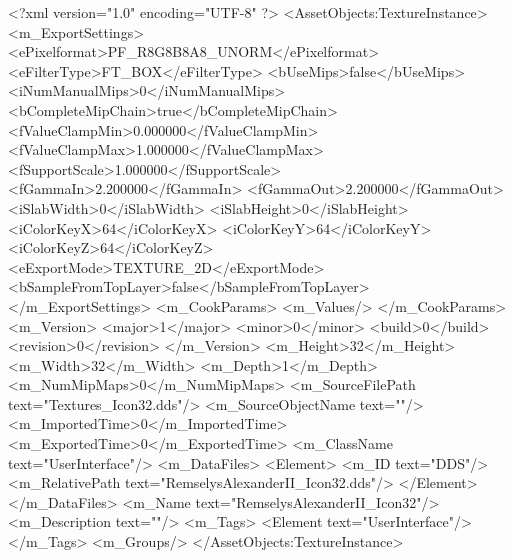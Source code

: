 <?xml version="1.0" encoding="UTF-8" ?>
<AssetObjects:TextureInstance>
	<m_ExportSettings>
		<ePixelformat>PF_R8G8B8A8_UNORM</ePixelformat>
		<eFilterType>FT_BOX</eFilterType>
		<bUseMips>false</bUseMips>
		<iNumManualMips>0</iNumManualMips>
		<bCompleteMipChain>true</bCompleteMipChain>
		<fValueClampMin>0.000000</fValueClampMin>
		<fValueClampMax>1.000000</fValueClampMax>
		<fSupportScale>1.000000</fSupportScale>
		<fGammaIn>2.200000</fGammaIn>
		<fGammaOut>2.200000</fGammaOut>
		<iSlabWidth>0</iSlabWidth>
		<iSlabHeight>0</iSlabHeight>
		<iColorKeyX>64</iColorKeyX>
		<iColorKeyY>64</iColorKeyY>
		<iColorKeyZ>64</iColorKeyZ>
		<eExportMode>TEXTURE_2D</eExportMode>
		<bSampleFromTopLayer>false</bSampleFromTopLayer>
	</m_ExportSettings>
	<m_CookParams>
		<m_Values/>
	</m_CookParams>
	<m_Version>
		<major>1</major>
		<minor>0</minor>
		<build>0</build>
		<revision>0</revision>
	</m_Version>
	<m_Height>32</m_Height>
	<m_Width>32</m_Width>
	<m_Depth>1</m_Depth>
	<m_NumMipMaps>0</m_NumMipMaps>
	<m_SourceFilePath text="Textures\RemselysAlexanderII_Icon32.dds"/>
	<m_SourceObjectName text=""/>
	<m_ImportedTime>0</m_ImportedTime>
	<m_ExportedTime>0</m_ExportedTime>
	<m_ClassName text="UserInterface"/>
	<m_DataFiles>
		<Element>
			<m_ID text="DDS"/>
			<m_RelativePath text="RemselysAlexanderII_Icon32.dds"/>
		</Element>
	</m_DataFiles>
	<m_Name text="RemselysAlexanderII_Icon32"/>
	<m_Description text=""/>
	<m_Tags>
		<Element text="UserInterface"/>
	</m_Tags>
	<m_Groups/>
</AssetObjects:TextureInstance>

